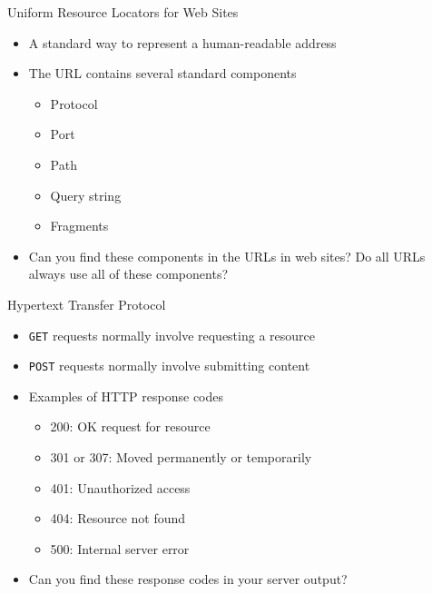 \documentclass[14pt,aspectratio=169]{beamer}
\begin{document}
%
\begin{frame}{Uniform Resource Locators for Web Sites}
  \begin{itemize}
    \item A standard way to represent a human-readable address
    \item The URL contains several standard components
      \begin{itemize}
        \item Protocol
        \item Port
        \item Path
        \item Query string
        \item Fragments
      \end{itemize}
      \vspace*{-.2in}
    \item Can you find these components in the URLs in web sites?
      Do all URLs always use all of these components?
  \end{itemize}
\end{frame}

%
\begin{frame}{Hypertext Transfer Protocol}
  \begin{itemize}
    \item {\tt GET} requests normally involve requesting a resource
    \vspace*{-.1in}
    \item {\tt POST} requests normally involve submitting content
    \vspace*{-.1in}
    \item Examples of HTTP response codes
      \begin{itemize}
        \item 200: OK request for resource
        \item 301 or 307: Moved permanently or temporarily
        \item 401: Unauthorized access
        \item 404: Resource not found
        \item 500: Internal server error
      \end{itemize}
      \vspace*{-.2in}
    \item Can you find these response codes in your server output?
  \end{itemize}
\end{frame}
\end{document}
